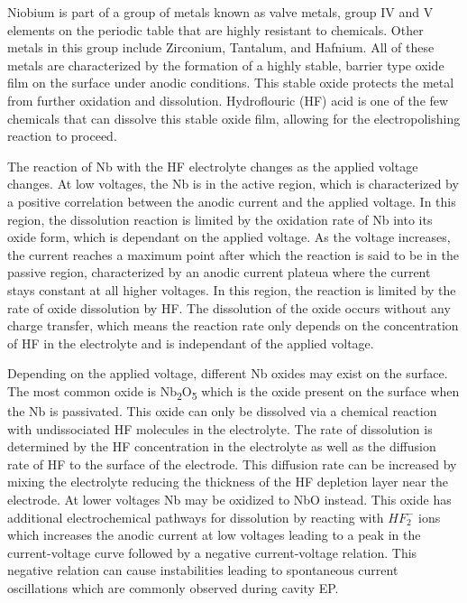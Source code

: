 Niobium is part of a group of metals known as valve metals, group IV and V elements on the periodic table that are highly resistant to chemicals. Other metals in this group include Zirconium, Tantalum, and Hafnium. All of these metals are characterized by the formation of a highly stable, barrier type oxide film on the surface under anodic conditions. This stable oxide protects the metal from further oxidation and dissolution. Hydroflouric (HF) acid is one of the few chemicals that can dissolve this stable oxide film, allowing for the electropolishing reaction to proceed. 

The reaction of Nb with the HF electrolyte changes as the applied voltage changes. At low voltages, the Nb is in the active region, which is characterized by a positive correlation between the anodic current and the applied voltage. In this region, the dissolution reaction is limited by the oxidation rate of Nb into its oxide form, which is dependant on the applied voltage. As the voltage increases, the current reaches a maximum point after which the reaction is said to be in the passive region, characterized by an anodic current plateua where the current stays constant at all higher voltages. In this region, the reaction is limited by the rate of oxide dissolution by HF. The dissolution of the oxide occurs without any charge transfer, which means the reaction rate only depends on the concentration of HF in the electrolyte and is independant of the applied voltage\cite{ranjith2018anodic}.

Depending on the applied voltage, different Nb oxides may exist on the surface. The most common oxide is Nb\textsubscript{2}O\textsubscript{5} which is the oxide present on the surface when the Nb is passivated. This oxide can only be dissolved via a chemical reaction with undissociated HF molecules in the electrolyte. The rate of dissolution is determined by the HF concentration in the electrolyte as well as the diffusion rate of HF to the surface of the electrode. This diffusion rate can be increased by mixing the electrolyte reducing the thickness of the HF depletion layer near the electrode\cite{tian2010evaluation}. At lower voltages Nb may be oxidized to NbO instead. This oxide has additional electrochemical pathways for dissolution by reacting with $HF_2^-$ ions which increases the anodic current at low voltages leading to a peak in the current-voltage curve followed by a negative current-voltage relation\cite{ranjith2018anodic}. This negative relation can cause instabilities leading to spontaneous current oscillations which are commonly observed during cavity EP\cite{khun2013smoothening}.









